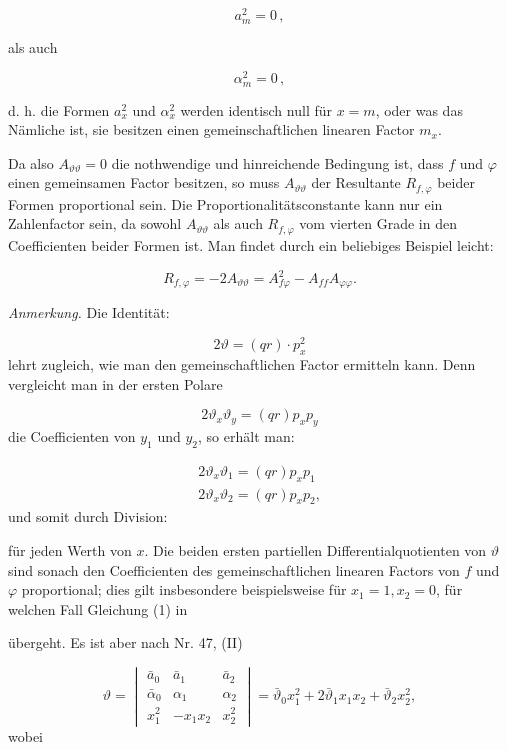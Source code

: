\[
a_m^2 = 0\,,
\]

als auch

\[
\alpha_m^2 = 0\,,
\]


d. h. die Formen $a_x^2$ und $\alpha_x^2$ werden identisch null für $x=m$, oder was das
Nämliche ist, sie besitzen einen gemeinschaftlichen linearen Factor $m_x$.

Da also $A_{\vartheta\vartheta}=0$ die nothwendige und hinreichende Bedingung ist,
dass $f$ und $\varphi$ einen gemeinsamen Factor besitzen, so muss $A_{\vartheta\vartheta}$
der Resultante $R_{f,\varphi}$ beider Formen proportional sein. Die
Proportionalitätsconstante kann nur ein Zahlenfactor sein, da sowohl $A_{\vartheta\vartheta}$
als auch $R_{f,\varphi}$ vom vierten Grade in den Coefficienten beider Formen ist. Man
findet durch ein beliebiges Beispiel leicht:

\[
R_{f,\varphi} = -2A_{\vartheta\vartheta} = A_{f\varphi}^2 - A_{ff}A_{\varphi\varphi}.
\]

\textit{Anmerkung.} Die Identität:

\[
2\vartheta = (qr)\cdot p_x^2
\]
lehrt zugleich, wie man den gemeinschaftlichen Factor ermitteln kann. Denn vergleicht
man in der ersten Polare

\[
2\vartheta_x\vartheta_y = (qr)p_xp_y
\]
die Coefficienten von $y_1$ und $y_2$, so erhält man:

\[
\begin{gathered}
2\vartheta_x\vartheta_1 = (qr)p_xp_1\\
2\vartheta_x\vartheta_2 = (qr)p_xp_2,
\end{gathered}
\]
und somit durch Division:


für jeden Werth von $x$. Die beiden ersten partiellen Differentialquotienten von
$\vartheta$ sind sonach den Coefficienten des gemeinschaftlichen linearen Factors von
$f$ und $\varphi$ proportional; dies gilt insbesondere beispielsweise für $x_1=1,
x_2=0$, für welchen Fall Gleichung (1) in


übergeht. Es ist aber nach Nr. 47, (II)

\[
\vartheta = \begin{vmatrix} \bar a_0 & \bar a_1 & \bar a_2 \\ \bar\alpha_0 & \alpha_1 & \alpha_2 \\ x_1^2 & -x_1x_2 & x_2^2 \end{vmatrix} = \bar\vartheta_0 x_1^2 + 2\bar\vartheta_1 x_1x_2 + \bar\vartheta_2 x_2^2,
\]
wobei

